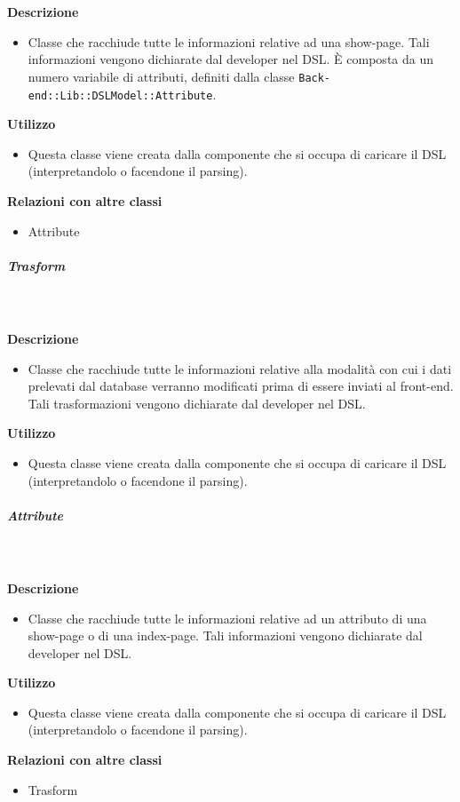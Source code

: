         \textbf{\\ \\ Descrizione} 
          \begin{itemize}
            \item[] Classe che racchiude tutte le informazioni relative ad una show-page. Tali informazioni vengono dichiarate dal developer nel DSL. È composta da un numero variabile di attributi, definiti dalla classe \texttt{Back-end::Lib::DSLModel::Attribute}.
          \end{itemize}      
        \textbf{Utilizzo}  
          \begin{itemize}
            \item[] Questa classe viene creata dalla componente che si occupa di caricare il DSL (interpretandolo o facendone il parsing).
          \end{itemize}
          \textbf{Relazioni con altre classi}
          \begin{itemize}
              \item{Attribute}
          \end{itemize}
      \subparagraph{Trasform}
        
        \textbf{\\ \\ Descrizione} 
          \begin{itemize}
            \item[] Classe che racchiude tutte le informazioni relative alla modalità con cui i dati prelevati dal database verranno modificati prima di essere inviati al front-end.
Tali trasformazioni vengono dichiarate dal developer nel DSL.
          \end{itemize}      
        \textbf{Utilizzo}  
          \begin{itemize}
            \item[] Questa classe viene creata dalla componente che si occupa di caricare il DSL (interpretandolo o facendone il parsing).
          \end{itemize}
      \subparagraph{Attribute}
        
        \textbf{\\ \\ Descrizione} 
          \begin{itemize}
            \item[] Classe che racchiude tutte le informazioni relative ad un attributo di una show-page o di una index-page. Tali informazioni vengono dichiarate dal developer nel DSL.
          \end{itemize}      
        \textbf{Utilizzo}  
          \begin{itemize}
            \item[] Questa classe viene creata dalla componente che si occupa di caricare il DSL (interpretandolo o facendone il parsing).
          \end{itemize}
          \textbf{Relazioni con altre classi}
          \begin{itemize}
              \item{Trasform}
          \end{itemize}
